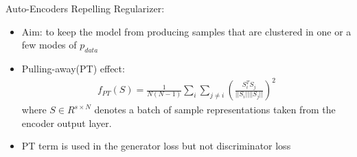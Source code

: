 \documentclass[mathserif]{beamer}
\begin{document}
\begin{frame}{Auto-Encoders}
  Repelling Regularizer:
  \begin{itemize}
    \item Aim: to keep the model from producing samples that are clustered in one or a few modes of $p_{data}$
    \item Pulling-away(PT) effect:
    \begin{align}
      f_{PT}(S)=\frac{1}{N(N-1)}\sum_{i}\sum_{j\not=i}(\frac{S_{i}^{T}S_{j}}{||S_{i}||||S_{j}||})^{2}
    \end{align}
    where $S\in R^{s\times N}$ denotes a batch of sample representations taken from the encoder output layer.
    \item PT term is used in the generator loss but not discriminator loss
  \end{itemize}
\end{frame}
\end{document}
